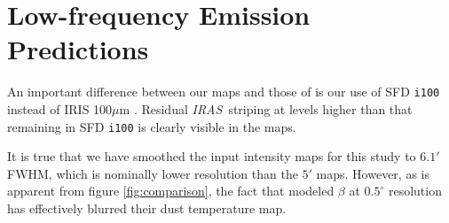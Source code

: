 \documentclass{emulateapj}
\newcommand{\IRAS}{{\it IRAS}}
\begin{document}




\section{Low-frequency Emission Predictions}


An important difference between our maps and those of \cite{planckdust} is our 
use of SFD \verb|i100| instead of IRIS 100$\mu$m \citep{IRIS}. Residual 
\IRAS~striping at levels higher than that remaining in SFD \verb|i100| is 
clearly visible in the \cite{planckdust} maps.

It is true that we have smoothed the input intensity maps for this study 
to $6.1'$ FWHM, which is nominally lower resolution than the $5'$ 
\cite{planckdust} maps. However, as is apparent from figure 
\ref{fig:comparison}, the fact that \cite{planckdust} modeled $\beta$ at 
$0.5^{\circ}$ resolution has effectively blurred their dust temperature map.

\end{document}
